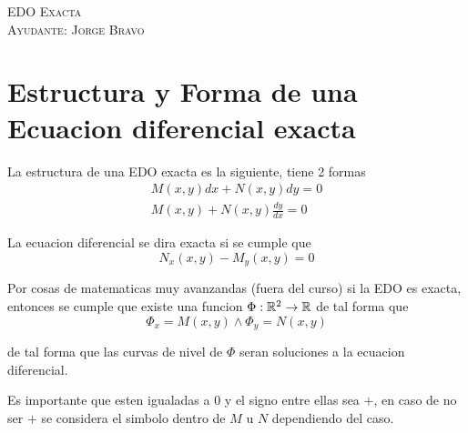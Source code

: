 \documentclass[a4paper,oneside,10.5pt]{article}
\begin{document}
\begin{center}
{\Large \textsc{EDO Exacta}}\\
\vspace{1em}
\textsc{Ayudante: Jorge Bravo}\\
\end{center}

\section*{Estructura y Forma de una Ecuacion diferencial exacta}
La estructura de una EDO exacta es la siguiente, tiene 2 formas
\begin{gather}
M(x, y) dx + N(x, y) dy = 0 \label{edo1}\\
M(x, y) + N(x, y) \frac{dy}{dx} = 0 \label{edo2}
\end{gather}

La ecuacion diferencial se dira exacta si se cumple que
\begin{equation*}
  N_{x}(x, y) - M_{y}(x, y) = 0
\end{equation*}

Por cosas de matematicas muy avanzandas (fuera del curso) si la EDO es exacta, entonces se cumple que existe una funcion $\Phi : \mathbb{R}^{2} \to \mathbb{R}$ de tal forma que
\begin{equation*}
  \Phi_{x} = M(x, y) \land \Phi_{y} = N(x, y)
\end{equation*}

de tal forma que las curvas de nivel de $\Phi$ seran soluciones a la ecuacion diferencial.


\begin{obs}
  Es importante que esten igualadas a $0$ y el signo entre ellas sea $+$, en caso de no ser $+$ se considera el simbolo dentro de $M$ u $N$ dependiendo del caso.
\end{obs}
\end{document}
